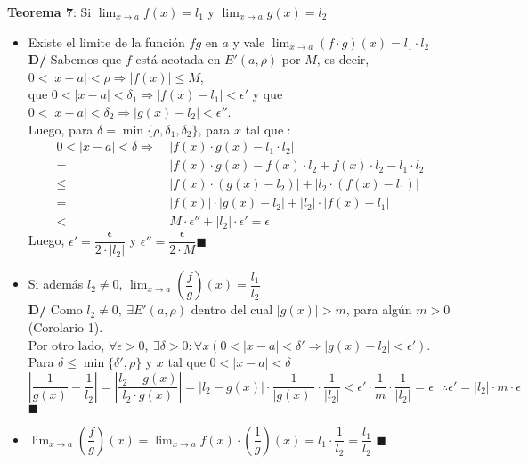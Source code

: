 \documentclass[11pt,a4paper]{article}
\newcommand*{\QEDA}{\null\nobreak\hfill\ensuremath{\blacksquare}}
\begin{document}
\newpage

\noindent \textbf{Teorema 7}: Si $\displaystyle{\lim_{x\to a}f(x) = l_1}$ y $\displaystyle{\lim_{x\to a}g(x) = l_2}$
\begin{itemize}
\item Existe el limite de la funci\'on $fg$ en $a$ y vale $\displaystyle{\lim_{x\to a}(f\cdot g)(x) = l_1\cdot l_2}$\\
\textbf{D/} Sabemos que $f$ est\'a acotada en $E'(a, \rho)$ por $M$, es decir, $0<|x-a|<\rho \Rightarrow |f(x)|\leq M$,\\
que $0<|x-a|<\delta_1 \Rightarrow |f(x)-l_1| < \epsilon'$ y que $0<|x-a|<\delta_2 \Rightarrow |g(x)-l_2| < \epsilon''$.\\
Luego, para $\delta = \min\{\rho, \delta_1, \delta_2\}$, para $x$ tal que :
\begin{align*}
0<|x-a|<\delta \Rightarrow \ &|f(x)\cdot g(x) - l_1\cdot l_2|\\
= \ &|f(x)\cdot g(x) - f(x)\cdot l_2 + f(x)\cdot l_2 - l_1\cdot l_2|\\
\leq \ &|f(x)\cdot (g(x) - l_2)| + |l_2 \cdot (f(x) - l_1)|\\
= \ &|f(x)|\cdot |g(x) - l_2| + |l_2| \cdot |f(x) - l_1|\\
< \ & M \cdot \epsilon'' + |l_2| \cdot \epsilon' = \epsilon
\end{align*}
Luego, $\epsilon' = \dfrac{\epsilon}{2\cdot |l_2|}$ y $\epsilon'' = \dfrac{\epsilon}{2\cdot M}$\QEDA
\item Si adem\'as $l_2 \not = 0$, $\displaystyle{\lim_{x\to a}\left(\dfrac{f}{g}\right)(x) = \dfrac{l_1}{l_2}}$\\
\textbf{D/} Como $l_2 \not = 0,\ \exists E'(a,\rho)$ dentro del cual $|g(x)| > m$, para alg\'un $m>0$ (Corolario 1).\\
Por otro lado, $\forall \epsilon>0,\ \exists \delta>0 : \forall x (0<|x-a|<\delta' \Rightarrow |g(x)-l_2| < \epsilon')$.\\
Para $\delta\leq \min\{\delta', \rho\}$ y $x$ tal que $0<|x-a|<\delta$\\ $\left|\dfrac{1}{g(x)} - \dfrac{1}{l_2}\right| = \left|\dfrac{l_2-g(x)}{l_2\cdot g(x)}\right| = |l_2-g(x)| \cdot \dfrac{1}{|g(x)|} \cdot \dfrac{1}{|l_2|} < \epsilon' \cdot \dfrac{1}{m} \cdot \dfrac{1}{|l_2|} = \epsilon\ \ \ \therefore \epsilon' = |l_2| \cdot m \cdot \epsilon$ \QEDA
\item $\displaystyle{\lim_{x\to a}\left(\dfrac{f}{g}\right)(x) = \lim_{x\to a}f(x) \cdot \left(\dfrac{1}{g}\right)(x) = l_1 \cdot \dfrac{1}{l_2} = \dfrac{l_1}{l_2}}$ \QEDA\\ \\
\end{itemize}
\end{document}
